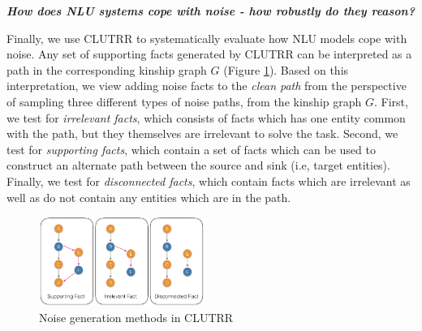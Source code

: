 \documentclass[12pt]{article}
\newcommand{\xhdr}[1]{{\noindent\bfseries #1}.}
\newcommand{\xit}[1]{{\noindent\textbf{\textit{#1}}}}
\begin{document}




\xit{How does NLU systems cope with noise - how robustly do they reason?}

Finally, we use CLUTRR to systematically evaluate how NLU models cope with noise.
Any set of supporting facts generated by CLUTRR can be interpreted as a path in the corresponding kinship graph $G$ (Figure \ref{fig:clutrr_data_noise}).
Based on this interpretation, we view adding noise facts to the \textit{clean path} from the perspective of sampling three different types of noise paths, from the kinship graph $G$. First, we test for \textit{irrelevant facts}, which consists of facts which has one entity common with the path, but they themselves are irrelevant to solve the task. Second, we test for \textit{supporting facts}, which contain a set of facts which can be used to construct an alternate path between the source and sink (i.e, target entities). Finally, we test for \textit{disconnected facts}, which contain facts which are irrelevant as well as do not contain any entities which are in the path.

\begin{figure}
\begin{center}
  \includegraphics[width=0.48\textwidth]{images/clutrr_noise.png}
\end{center}
\caption{Noise generation methods in CLUTRR}
\label{fig:clutrr_data_noise}
\end{figure}
\end{document}
